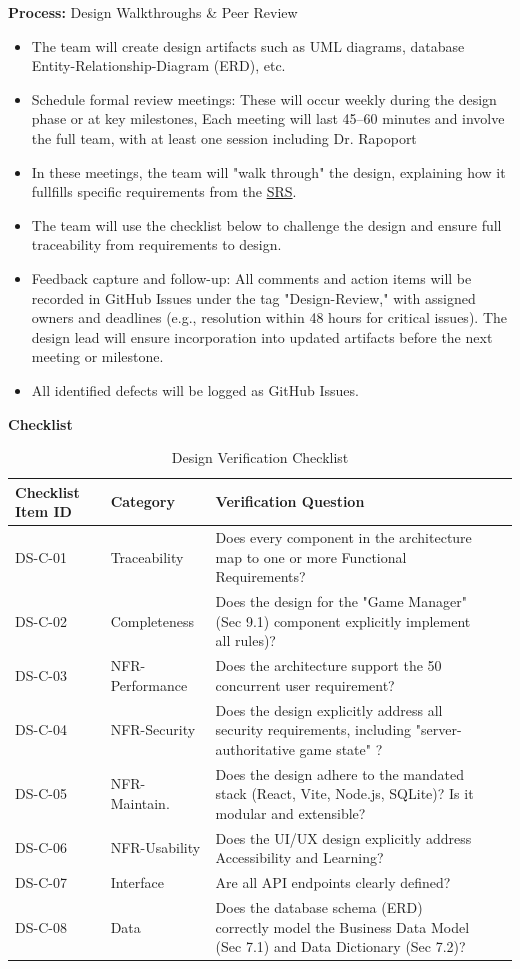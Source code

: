 \documentclass[12pt, titlepage]{article}
\begin{document}
\noindent \textbf{Process:} Design Walkthroughs \& Peer Review
\begin{itemize}
	\item The team will create design artifacts such as UML diagrams, database Entity-Relationship-Diagram (ERD), etc.
	\item Schedule formal review meetings: These will occur weekly during the design phase or at key milestones, Each meeting will last 45–60 minutes and involve the full team, with at least one session including Dr. Rapoport
	\item In these meetings, the team will "walk through" the design, explaining how it fullfills specific requirements from the \href{../SRS/SRS.pdf}{SRS}.
	\item The team will use the checklist below to challenge the design and ensure full traceability from requirements to design.
	\item Feedback capture and follow-up: All comments and action items will be recorded in GitHub Issues under the tag "Design-Review," with assigned owners and deadlines (e.g., resolution within 48 hours for critical issues). The design lead will ensure incorporation into updated artifacts before the next meeting or milestone.
	\item All identified defects will be logged as GitHub Issues.
\end{itemize}

\noindent \textbf{Checklist}
\begin{table}[H]
\centering
\caption{Design Verification Checklist}
\label{tab:design-checklist}
\begin{tabular}{|l|l|p{}|l|l|}
\hline
\textbf{Checklist Item ID} & \textbf{Category} & \textbf{Verification Question}  \\ \hline
DS-C-01 & Traceability & Does every component in the architecture map to one or more Functional Requirements? \\ \hline
DS-C-02 & Completeness & Does the design for the "Game Manager" (Sec 9.1) component explicitly implement all rules)? \\ \hline
DS-C-03 & NFR-Performance & Does the architecture support the 50 concurrent user requirement? \\ \hline
DS-C-04 & NFR-Security & Does the design explicitly address all security requirements, including "server-authoritative game state" ?  \\ \hline
DS-C-05 & NFR-Maintain. & Does the design adhere to the mandated stack (React, Vite, Node.js, SQLite)?  Is it modular and extensible?  \\ \hline
DS-C-06 & NFR-Usability & Does the UI/UX design explicitly address Accessibility and Learning?  \\ \hline
DS-C-07 & Interface & Are all API endpoints clearly defined?  \\ \hline
DS-C-08 & Data & Does the database schema (ERD) correctly model the Business Data Model (Sec 7.1) and Data Dictionary (Sec 7.2)? \\ \hline
\end{tabular}
\end{table}
\end{document}
